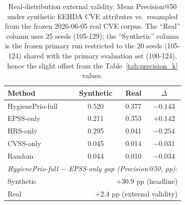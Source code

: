 \begin{table}[!t]
 \caption{Real-distribution external validity. Mean Precision@50 under
 synthetic EEHDA CVE attributes vs.\ resampled from the frozen
 2026-06-05 real CVE corpus. The ``Real'' column uses 25 seeds
 (105-129); the ``Synthetic'' column is the frozen primary run
 restricted to the 20 seeds (105-124) shared with the primary
 evaluation set (100-124), hence the slight offset from the
 Table~\ref{tab:precision_k} values.}
 \label{tab:external_validity}
 \centering
 \small
 \setlength{\tabcolsep}{4pt}
 \begin{tabular}{@{}lccc@{}}
 \toprule
 \textbf{Method} & \textbf{Synthetic} & \textbf{Real} & \textbf{$\Delta$} \\
 \midrule
 HygienePrio-full & 0.520 & 0.377 & $-0.143$ \\
 EPSS-only & 0.211 & 0.353 & $+0.142$ \\
 HRS-only & 0.295 & 0.041 & $-0.254$ \\
 CVSS-only & 0.045 & 0.014 & $-0.031$ \\
 Random & 0.044 & 0.010 & $-0.034$ \\
 \midrule
 \multicolumn{4}{l}{\textit{HygienePrio-full $-$ EPSS-only gap (Precision@50, pp):}} \\
 Synthetic & \multicolumn{3}{r}{$+30.9$ pp (headline)} \\
 Real & \multicolumn{3}{r}{$+2.4$ pp (external validity)} \\
 \bottomrule
 \end{tabular}
\end{table}

